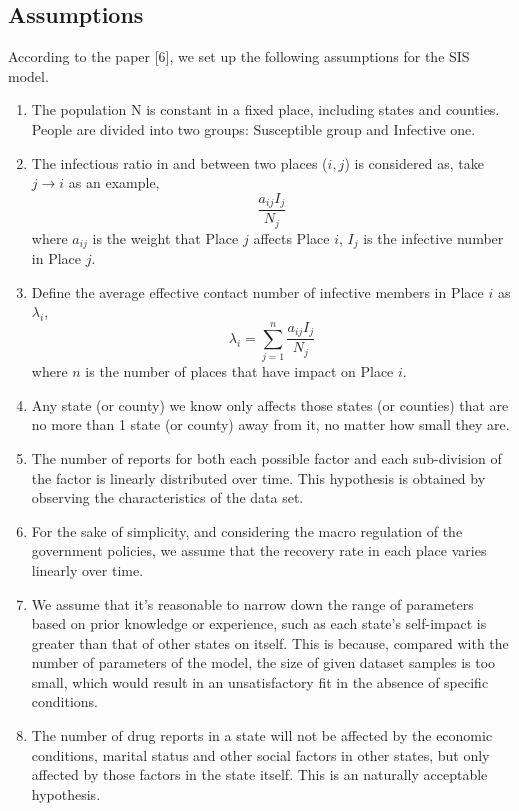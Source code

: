 \subsection{Assumptions}
According to the paper [6], we set up the following assumptions for the SIS model.
\begin{enumerate}[\bfseries A.]
    \item The population N is constant in a fixed place, including states and counties. People are divided into two groups: Susceptible group and Infective one.
    \item The infectious ratio in and between two places ($i, j$) is considered as, take $j\rightarrow i$ as an example, $$\frac{a_{ij}I_{j}}{N_j}$$ where $a_{ij}$ is the weight that Place $j$ affects Place $i$, $I_j$ is the infective number in Place $j$.
    \item Define the average effective contact number of infective members in Place $i$ as $\lambda_i$, $$\lambda_i=\sum_{j=1}^n{\frac{a_{ij}I_j}{N_j}} $$ where $n$ is the number of places that have impact on Place $i$.
    \item Any state (or county) we know only affects those states (or counties) that are no more than 1 state (or county) away from it, no matter how small they are.
    \item The number of reports for both each possible factor and each sub-division of the factor is linearly distributed over time. This hypothesis is obtained by observing the characteristics of the data set.
    \item For the sake of simplicity, and considering the macro regulation of the government policies, we assume that the recovery rate in each place varies linearly over time.
    \item We assume that it’s reasonable to narrow down the range of parameters based on prior knowledge or experience, such as each state's self-impact is greater than that of other states on itself. This is because, compared with the number of parameters of the model, the size of given dataset samples is too small, which would result in an unsatisfactory fit in the absence of specific conditions.
    \item The number of drug reports in a state will not be affected by the economic conditions, marital status and other social factors in other states, but only affected by those factors in the state itself. This is an naturally acceptable hypothesis.
\end{enumerate}

